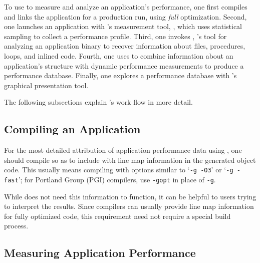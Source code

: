 \documentclass[11pt,letterpaper]{report}
\begin{document}
To use \HPCToolkit{} to measure and analyze an application's performance, one first compiles and links the application for a production run, using \emph{full} optimization.
Second, one launches an application with \HPCToolkit{}'s measurement tool, \hpcrun{}, which uses statistical sampling to collect a performance profile.
Third, one invokes \hpcstruct{}, \HPCToolkit{}'s tool for analyzing an application binary to recover information about files, procedures, loops, and inlined code.
Fourth, one uses \hpcprof{} to combine information about an application's structure with dynamic performance measurements to produce a performance database.
Finally, one explores a performance database with \HPCToolkit{}'s \hpcviewer{} graphical presentation tool.

The following subsections explain \HPCToolkit{}'s work flow in more detail.



\subsection{Compiling an Application}

For the most detailed attribution of application performance data using \HPCToolkit{}, one should compile so as to include with line map information in the generated object code.
This usually means compiling with options similar to `\texttt{-g -O3}' or `\texttt{-g -fast}'; for Portland Group (PGI) compilers, use \texttt{-gopt} in place of \texttt{-g}.

While \HPCToolkit{} does not need this information to function, it can be helpful to users trying to interpret the results.
Since compilers can usually provide line map information for fully optimized code, this requirement need not require a special build process.



\subsection{Measuring Application Performance}
\label{chpt:quickstart:tour:measurement}
\end{document}
